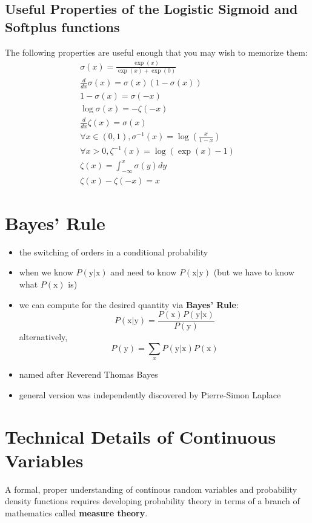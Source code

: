 \documentclass[11pt, twocolumn]{report}
\begin{document}
\subsection{Useful Properties of the Logistic Sigmoid and Softplus functions}
The following properties are useful enough that you may wish to memorize them:
\begin{align}
  \sigma(x) = \frac{\exp(x)}{\exp(x) + \exp(0)} \\
  \frac{d}{dx} \sigma(x) = \sigma(x)(1 - \sigma(x)) \\
  1 - \sigma(x) = \sigma(-x) \\
  \log \sigma(x) = -\zeta(-x) \\
  \frac{d}{dx} \zeta(x) = \sigma(x) \\
  \forall x \in (0, 1), \sigma^{-1}(x) = \log \left( \frac{x}{1 - x} \right) \\
  \forall x > 0, \zeta^{-1}(x) = \log(\exp(x) - 1) \\
  \zeta(x) = \int_{-\infty}^x \sigma(y)dy \\
  \zeta(x) - \zeta(-x) = x
\end{align}

\section{Bayes' Rule}
\begin{itemize}
  \item the switching of orders in a conditional probability
  \item when we know $P(\text{y} | \text{x})$ and need to know $P(\text{x} |
    \text{y})$ (but we have to know what $P(\text{x})$ is)
  \item we can compute for the desired quantity via \textbf{Bayes' Rule}:
    \begin{equation}
      P(\text{x} | \text{y}) = \frac{P(\text{x})P(\text{y} |
        \text{x})}{P(\text{y})}
    \end{equation}
    alternatively,
    \begin{equation}
      P(\text{y}) = \sum_x P(\text{y}|\text{x})P(\text{x})
    \end{equation}
  \item named after Reverend Thomas Bayes
  \item general version was independently discovered by Pierre-Simon Laplace
\end{itemize}

\section{Technical Details of Continuous Variables}
A formal, proper understanding of continous random variables and
probability density functions requires developing probability theory in terms
of a branch of mathematics called \textbf{measure theory}.
\end{document}
